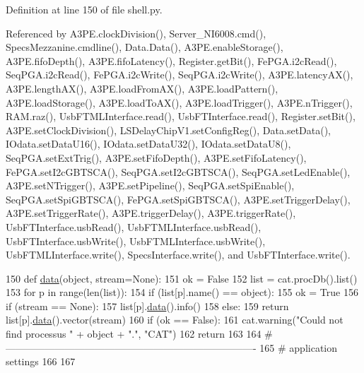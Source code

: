 Definition at line 150 of file shell.\+py.



Referenced by A3\+P\+E.\+clock\+Division(), Server\+\_\+\+N\+I6008.\+cmd(), Specs\+Mezzanine.\+cmdline(), Data.\+Data(), A3\+P\+E.\+enable\+Storage(), A3\+P\+E.\+fifo\+Depth(), A3\+P\+E.\+fifo\+Latency(), Register.\+get\+Bit(), Fe\+P\+G\+A.\+i2c\+Read(), Seq\+P\+G\+A.\+i2c\+Read(), Fe\+P\+G\+A.\+i2c\+Write(), Seq\+P\+G\+A.\+i2c\+Write(), A3\+P\+E.\+latency\+A\+X(), A3\+P\+E.\+length\+A\+X(), A3\+P\+E.\+load\+From\+A\+X(), A3\+P\+E.\+load\+Pattern(), A3\+P\+E.\+load\+Storage(), A3\+P\+E.\+load\+To\+A\+X(), A3\+P\+E.\+load\+Trigger(), A3\+P\+E.\+n\+Trigger(), R\+A\+M.\+raz(), Usb\+F\+T\+M\+L\+Interface.\+read(), Usb\+F\+T\+Interface.\+read(), Register.\+set\+Bit(), A3\+P\+E.\+set\+Clock\+Division(), L\+S\+Delay\+Chip\+V1.\+set\+Config\+Reg(), Data.\+set\+Data(), I\+Odata.\+set\+Data\+U16(), I\+Odata.\+set\+Data\+U32(), I\+Odata.\+set\+Data\+U8(), Seq\+P\+G\+A.\+set\+Ext\+Trig(), A3\+P\+E.\+set\+Fifo\+Depth(), A3\+P\+E.\+set\+Fifo\+Latency(), Fe\+P\+G\+A.\+set\+I2c\+G\+B\+T\+S\+C\+A(), Seq\+P\+G\+A.\+set\+I2c\+G\+B\+T\+S\+C\+A(), Seq\+P\+G\+A.\+set\+Led\+Enable(), A3\+P\+E.\+set\+N\+Trigger(), A3\+P\+E.\+set\+Pipeline(), Seq\+P\+G\+A.\+set\+Spi\+Enable(), Seq\+P\+G\+A.\+set\+Spi\+G\+B\+T\+S\+C\+A(), Fe\+P\+G\+A.\+set\+Spi\+G\+B\+T\+S\+C\+A(), A3\+P\+E.\+set\+Trigger\+Delay(), A3\+P\+E.\+set\+Trigger\+Rate(), A3\+P\+E.\+trigger\+Delay(), A3\+P\+E.\+trigger\+Rate(), Usb\+F\+T\+Interface.\+usb\+Read(), Usb\+F\+T\+M\+L\+Interface.\+usb\+Read(), Usb\+F\+T\+Interface.\+usb\+Write(), Usb\+F\+T\+M\+L\+Interface.\+usb\+Write(), Usb\+F\+T\+M\+L\+Interface.\+write(), Specs\+Interface.\+write(), and Usb\+F\+T\+Interface.\+write().


\begin{DoxyCode}
150 \textcolor{keyword}{def }\hyperlink{namespaceshell_a5ea2525995cedc3efd69ea8a7f034d1e}{data}(object, stream=None):
151   ok = \textcolor{keyword}{False}
152   list = cat.procDb().list()
153   \textcolor{keywordflow}{for} p \textcolor{keywordflow}{in} range(len(list)):
154     \textcolor{keywordflow}{if} (list[p].name() == object):
155       ok = \textcolor{keyword}{True}
156       \textcolor{keywordflow}{if} (stream == \textcolor{keywordtype}{None}):
157         list[p].\hyperlink{namespaceshell_a5ea2525995cedc3efd69ea8a7f034d1e}{data}().info()
158       \textcolor{keywordflow}{else}:
159         \textcolor{keywordflow}{return} list[p].\hyperlink{namespaceshell_a5ea2525995cedc3efd69ea8a7f034d1e}{data}().vector(stream)
160   \textcolor{keywordflow}{if} (ok == \textcolor{keyword}{False}):
161     cat.warning(\textcolor{stringliteral}{"Could not find processus "} + object + \textcolor{stringliteral}{"."}, \textcolor{stringliteral}{"CAT"})
162     \textcolor{keywordflow}{return}
163 
164 \textcolor{comment}{#----------------------------------------------------------------------------}
165 \textcolor{comment}{# application settings}
166 
167 
\end{DoxyCode}
\mbox{\label{namespaceshell_a324876531afa651f59288dbab3f5603a}} 

